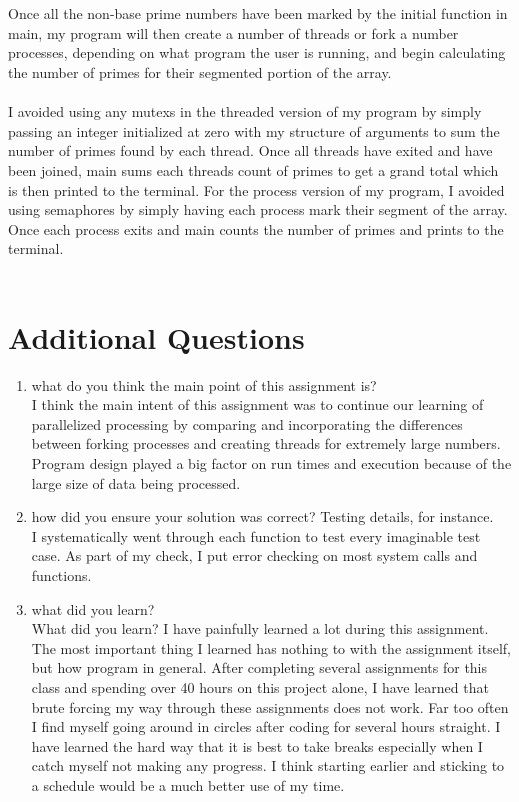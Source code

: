 \documentclass[12pt,letterpaper]{article}
\begin{document}
\\\\
Once all the non-base prime numbers have been marked by the initial function in main, my program will then create a number of threads or fork a number processes, depending on what program the user is running, and begin calculating the number of primes for their segmented portion of the array.
\\\\
I avoided using any mutexs in the threaded version of my program by simply passing an integer initialized at zero with my structure of arguments to sum the number of primes found by each thread. Once all threads have exited and have been joined, main sums each threads count of primes to get a grand total which is then printed to the terminal. For the process version of my program, I avoided using semaphores by simply having each process mark their segment of the array. Once each process exits and main counts the number of primes and prints to the terminal.
\\\\

\section{Additional Questions}
\begin{enumerate}
    \item
    what do you think the main point of this assignment is?
\\
I think the main intent of this assignment was to continue our learning of parallelized processing by comparing and incorporating the differences between forking processes and creating threads for extremely large numbers. Program design played a big factor on run times and execution because of the large size of data being processed.

    \item
    how did you ensure your solution was correct? Testing details, for instance.
\\
I systematically went through each function to test every imaginable test case. As part of my check, I put error checking on most system calls and functions. 
    
    \item
    what did you learn?
\\
What did you learn?
I have painfully learned a lot during this assignment. The most important thing I learned has nothing to with the assignment itself, but how program in general. After completing several assignments for this class and spending over 40 hours on this project alone, I have learned that brute forcing my way through these assignments does not work. Far too often I find myself going around in circles after coding for several hours straight. I have learned the hard way that it is best to take breaks especially when I catch myself not making any progress. I think starting earlier and sticking to a schedule would be a much better use of my time. 
    
\end{enumerate}
\end{document}
